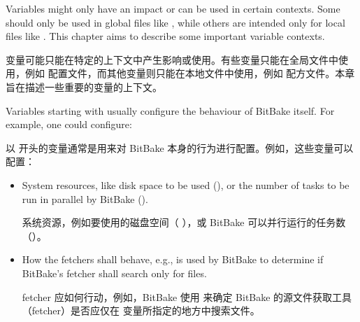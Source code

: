 % 
% 
% 


Variables might only have an impact or can be used in certain contexts. Some should only be used in global files like , while others are intended only for local files like . This chapter aims to describe some important variable contexts.

变量可能只能在特定的上下文中产生影响或使用。有些变量只能在全局文件中使用，例如  配置文件，而其他变量则只能在本地文件中使用，例如  配方文件。本章旨在描述一些重要的变量的上下文。

Variables starting with  usually configure the behaviour of BitBake itself. For example, one could configure:

以  开头的变量通常是用来对 BitBake 本身的行为进行配置。例如，这些变量可以配置：

\begin{itemize}
\setlength\itemsep{1.0em}
\item System resources, like disk space to be used (), or the number of tasks to be run in parallel by BitBake ().

\medskip
系统资源，例如要使用的磁盘空间（ ），或 BitBake 可以并行运行的任务数\linebreak（）。

\item How the fetchers shall behave, e.g.,  is used by BitBake to determine if BitBake's fetcher shall search only  for files.

\medskip
fetcher 应如何行动，例如，BitBake 使用  来确定 BitBake 的源文件获取工具（fetcher）是否应仅在  变量所指定的地方中搜索文件。
\end{itemize}

